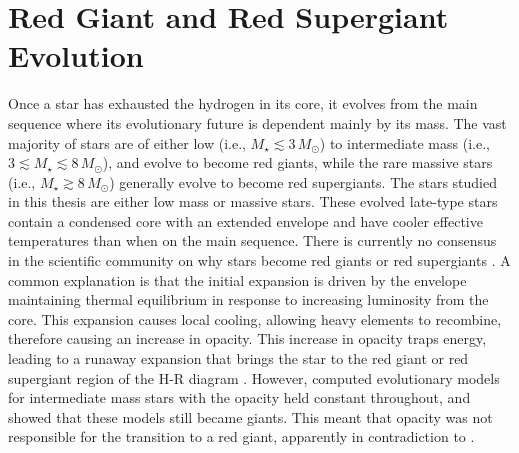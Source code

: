 \section{Red Giant and Red Supergiant Evolution}\label{sec:1.5}
Once a star has exhausted the hydrogen in its core, it evolves from the main sequence where its evolutionary future is dependent mainly by its mass. The vast majority of stars are of either low (i.e., $M_{\star} \lesssim 3\,M_{\odot}$) to intermediate mass (i.e., $ 3 \lesssim M_{\star} \lesssim 8\,M_{\odot}$), and evolve to become red giants, while the rare massive stars (i.e., $M_{\star} \gtrsim 8\,M_{\odot}$) generally evolve to become red supergiants. The stars studied in this thesis are either low mass or massive stars. These evolved late-type stars contain a condensed core with an extended envelope and have cooler effective temperatures than when on the main sequence. There is currently no consensus in the scientific community on why stars become red giants or red supergiants \citep[e.g.,][]{sugimoto_2000,stancliffe_2009}. A common explanation is that the initial expansion is driven by the envelope maintaining thermal equilibrium in response to increasing luminosity from the core. This expansion causes local cooling, allowing heavy elements to recombine, therefore causing an increase in opacity. This increase in opacity traps energy, leading to a runaway expansion that brings the star to the red giant or red supergiant region of the H-R diagram \citep{renzini_1992}. However, \cite{iben_1993} computed evolutionary models for intermediate mass stars with the opacity held constant throughout, and showed that these models still became giants. This meant that opacity was not responsible for the transition to a red giant, apparently in contradiction to \cite{renzini_1992}. 



